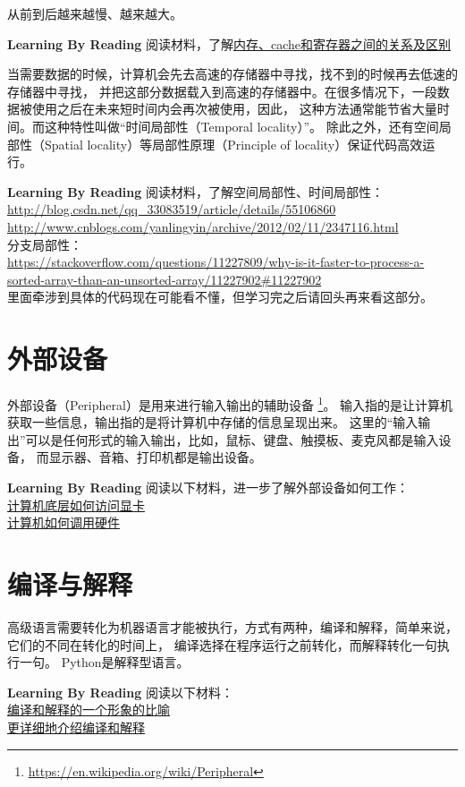 从前到后越来越慢、越来越大。
\begin{paperbox}{\textbf{Learning By Reading}\starthree}
阅读材料，了解\href{http://blog.csdn.net/hellojoy/article/details/54744231}{内存、cache和寄存器之间的关系及区别}
\end{paperbox}
当需要数据的时候，计算机会先去高速的存储器中寻找，找不到的时候再去低速的存储器中寻找，
并把这部分数据载入到高速的存储器中。在很多情况下，一段数据被使用之后在未来短时间内会再次被使用，因此，
这种方法通常能节省大量时间。而这种特性叫做“时间局部性（Temporal locality）”。
除此之外，还有空间局部性（Spatial locality）等局部性原理（Principle of locality）保证代码高效运行。
\begin{paperbox}{\textbf{Learning By Reading}\startwo}
阅读材料，了解空间局部性、时间局部性：\\
\url{http://blog.csdn.net/qq_33083519/article/details/55106860}\\
\url{http://www.cnblogs.com/yanlingyin/archive/2012/02/11/2347116.html}\\
分支局部性：\\
\url{https://stackoverflow.com/questions/11227809/why-is-it-faster-to-process-a-sorted-array-than-an-unsorted-array/11227902#11227902}\\
里面牵涉到具体的代码现在可能看不懂，但学习完之后请回头再来看这部分。
\end{paperbox}
\section{外部设备}
外部设备（Peripheral）是用来进行输入输出的辅助设备
\footnote{\url{https://en.wikipedia.org/wiki/Peripheral}}。
输入指的是让计算机获取一些信息，输出指的是将计算机中存储的信息呈现出来。
这里的“输入输出”可以是任何形式的输入输出，比如，鼠标、键盘、触摸板、麦克风都是输入设备，
而显示器、音箱、打印机都是输出设备。\\
\begin{paperbox}{\textbf{Learning By Reading}\starone}
阅读以下材料，进一步了解外部设备如何工作：\\
\href{https://www.zhihu.com/question/20722310}{计算机底层如何访问显卡}\\
\href{https://www.zhihu.com/question/39846396}{计算机如何调用硬件}
\end{paperbox}
\section{编译与解释}
高级语言需要转化为机器语言才能被执行，方式有两种，编译和解释，简单来说，它们的不同在转化的时间上，
编译选择在程序运行之前转化，而解释转化一句执行一句。
Python是解释型语言。
\begin{paperbox}{\textbf{Learning By Reading}\starthree}
阅读以下材料：\\
\href{https://www.zhihu.com/question/21486706/answer/32975999}{编译和解释的一个形象的比喻}\\
\href{http://alexyyek.github.io/2015/01/08/CompileAndInterpreter/}{更详细地介绍编译和解释}
\end{paperbox}
